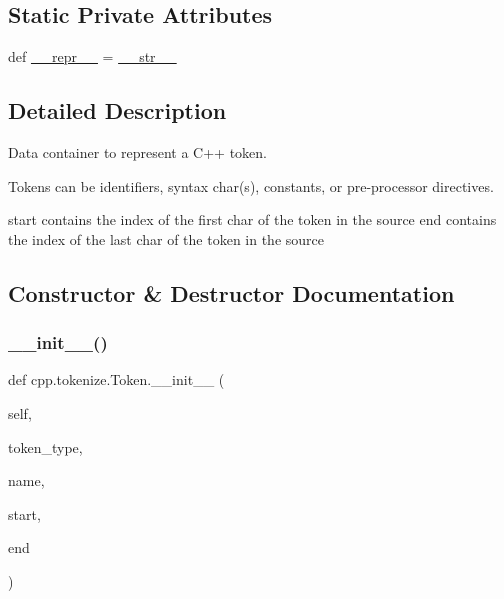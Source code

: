 \subsection*{Static Private Attributes}
\begin{DoxyCompactItemize}
\item 
def \mbox{\hyperlink{classcpp_1_1tokenize_1_1_token_a7bde2890a76f4108d61d10e4de68d715}{\+\_\+\+\_\+repr\+\_\+\+\_\+}} = \mbox{\hyperlink{classcpp_1_1tokenize_1_1_token_a98e024051039637a18601fcbb0232cc2}{\+\_\+\+\_\+str\+\_\+\+\_\+}}
\end{DoxyCompactItemize}


\subsection{Detailed Description}
\begin{DoxyVerb}Data container to represent a C++ token.

Tokens can be identifiers, syntax char(s), constants, or
pre-processor directives.

start contains the index of the first char of the token in the source
end contains the index of the last char of the token in the source
\end{DoxyVerb}
 

\subsection{Constructor \& Destructor Documentation}
\mbox{\label{classcpp_1_1tokenize_1_1_token_a7da7659a5a6c61d0f4b8590cf96e19fd}} 
\subsubsection{\texorpdfstring{\_\_init\_\_()}{\_\_init\_\_()}}
{\footnotesize\ttfamily def cpp.\+tokenize.\+Token.\+\_\+\+\_\+init\+\_\+\+\_\+ (\begin{DoxyParamCaption}\item[{}]{self,  }\item[{}]{token\+\_\+type,  }\item[{}]{name,  }\item[{}]{start,  }\item[{}]{end }\end{DoxyParamCaption})}



